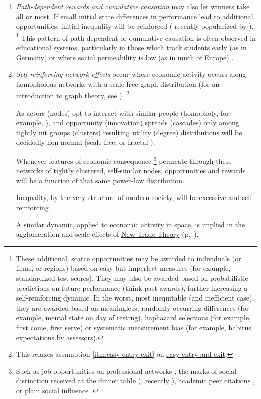 \begin{enumerate}
	\item {} \label{sec:cumulative-causation}
	\emph{Path-dependent rewards and cumulative causation} may also let winners take all or most.
	If small initial state differences in performance lead to additional opportunities, initial inequality will be reinforced (\citealt{Jackson1968, Merton1988} recently popularized by \citealt{Gladwell}).
	\footnote{
		These additional, scarce opportunities may be awarded to individuals (or firms, or regions) based on easy but imperfect measures (for example, standardized test scores).
		They may also be awarded based on probabilistic predictions on future performance (think past awards), further increasing a self-reinforcing dynamic.
		In the worst, most inequitable (and inefficient case), they are awarded based on meaningless, randomly occurring differences (for example, mental state on day of testing), haphazard selections (for example, first come, first serve) or systematic measurement bias (for example, habitus expectations by assessors).
	}
	This pattern of path-dependent or cumulative causation is often observed in educational systems, particularly in those which track students early (as in Germany) or where social permeability is low (as in much of Europe) \citep{OECD2006}.

	\item {} \label{sec:network-effects} \emph{Self-reinforcing network effects}
	occur where economic activity occurs along homopholous networks with a scale-free graph distribution (for an introduction to graph theory, see \citealt{Kleinberg-2009-oz}).
	\footnote{
		This relaxes  assumption \ref{itm:easy-entry-exit} on \hyperref[itm:easy-entry-exit]{easy entry and exit}.
	}

	As actors (nodes) opt to interact with similar people (homopholy, for example, \citealt{Mcpherson2001}), and opportunity (innovation) spreads (cascades) only among tightly nit groups (clusters) \citep{Bass1969} resulting utility (degree) distributions will be decidedly non-normal (scale-free, or fractal \citep{Mandelbrot2004}).

	Whenever features of economic consequence
	\footnote{
		Such as job opportunities on professional networks \citep{Benkler2006}, the marks of social distinction received at the dinner table (\citealt{Bourdieu-1984-aa}, recently \citealt{Hartmann2002}), academic peer citations \citep{Jackson1968, Merton1988}, or plain social influence \citep{Asch}.
	}
	permeate through these networks of tightly clustered, self-similar nodes, opportunities and rewards will be a function of that same power-law distribution.

	Inequality, by the very structure of modern society, will be excessive and self-reinforcing \citep{Cozzi2009,Keller2005,Andriani2007}.

	A similar dynamic, applied to economic activity in space, is implied in the agglomeration and scale effects of \hyperref[sec:ntt]{New Trade Theory} (p.~\pageref{sec:ntt}).
\end{enumerate}

